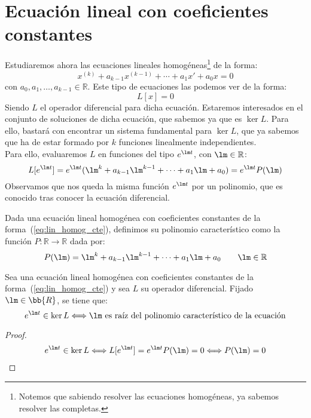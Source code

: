 \section{Ecuación lineal con coeficientes constantes}
\noindent
Estudiaremos ahora las ecuaciones lineales homogéneas\footnote{Notemos que sabiendo resolver las ecuaciones homogéneas, ya sabemos resolver las completas.} de la forma:
\begin{equation}\label{eq:lin_homog_cte}
    x^{(k)} + a_{k-1}x^{(k-1)} + \cdots + a_1x' + a_0 x = 0
\end{equation}
con $a_0,a_1,\ldots,a_{k-1}\in \mathbb{R}$. Este tipo de ecuaciones las podemos ver de la forma:
\begin{equation*}
    L[x] = 0
\end{equation*}
Siendo $L$ el operador diferencial para dicha ecuación. Estaremos interesados en el conjunto de soluciones de dicha ecuación, que sabemos ya que es $\ker L$. Para ello, bastará con encontrar un sistema fundamental para $\ker L$, que ya sabemos que ha de estar formado por $k$ funciones linealmente independientes.\\

\noindent
Para ello, evaluaremos $L$ en funciones del tipo $e^{\lm t}$, con $\lm \in \mathbb{R}$:
\begin{equation*}
    L[e^{\lm t}] = e^{\lm t}(\lm^{k} + a_{k-1}\lm^{k-1} + \cdots + a_1 \lm + a_0) = e^{\lm t} P(\lm)
\end{equation*}
Observamos que nos queda la misma función $e^{\lm t}$ por un polinomio, que es conocido tras conocer la ecuación diferencial.

\begin{definicion}
    Dada una ecuación lineal homogénea con coeficientes constantes de la forma~(\ref{eq:lin_homog_cte}), definimos su polinomio característico como la función $P:\mathbb{R}\rightarrow\mathbb{R}$ dada por:
    \begin{equation*}
        P(\lm) = \lm^{k} + a_{k-1}\lm^{k-1} + \cdots + a_1 \lm + a_0 \qquad \lm \in \mathbb{R}
    \end{equation*}
\end{definicion}

\begin{prop}
    Sea una ecuación lineal homogénea con coeficientes constantes de la forma~(\ref{eq:lin_homog_cte}) y sea $L$ su operador diferencial. Fijado $\lm\in \bb{R}$, se tiene que:
    \begin{equation*}
        e^{\lm t} \in \ker L \Longleftrightarrow \lm \text{\ es raíz del polinomio característico de la ecuación}
    \end{equation*}
    \begin{proof}
        \begin{align*}
            e^{\lm t} \in \ker L \Longleftrightarrow L[e^{\lm t}] = e^{\lm t} P(\lm) = 0 \Longleftrightarrow P(\lm) = 0
        \end{align*}
    \end{proof}
\end{prop}

